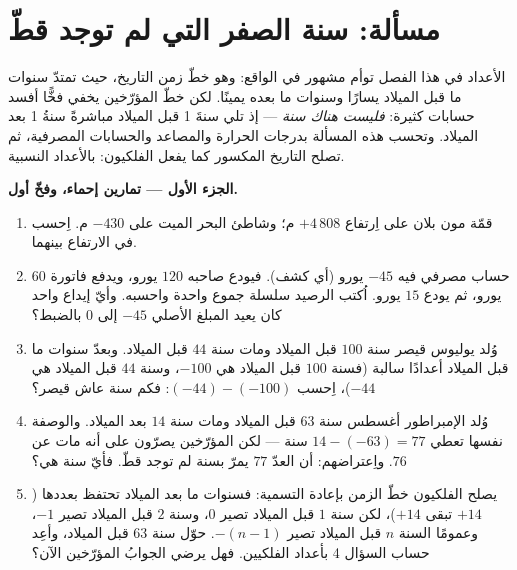 \section{مسألة: سنة الصفر التي لم توجد قطّ}

\begin{problem}
\label{pb:g7:negatives:1}
 الأعداد في هذا الفصل توأم مشهور في الواقع: وهو
خطّ زمن التاريخ، حيث تمتدّ سنوات ما قبل الميلاد يسارًا
وسنوات ما بعده يمينًا. لكن خطّ المؤرّخين يخفي فخًّا
أفسد حسابات كثيرة: \emph{فليست هناك سنة }
--- إذ تلي سنةَ 1 قبل الميلاد مباشرةً سنةُ 1 بعد الميلاد. وتحسب هذه المسألة
بدرجات الحرارة والمصاعد والحسابات المصرفية، ثم تصلح
 التاريخ المكسور كما يفعل الفلكيون: بالأعداد
النسبية.

\medskip
\noindent\textbf{الجزء الأول --- تمارين إحماء، وفخّ أول.}
\begin{enumerate}
  \item قمّة مون بلان على اِرتفاع $+4\,808$ م؛ وشاطئ
        البحر الميت على $-430$ م. اِحسب 
        في الارتفاع بينهما.
  \item حساب مصرفي فيه $-45$ يورو (أي كشف). فيودع
        صاحبه $120$ يورو، ويدفع فاتورة $60$ يورو،
        ثم يودع $15$ يورو. اُكتب الرصيد سلسلة
        جموع واحدة واحسبه. وأيّ إيداع واحد
        كان يعيد المبلغ الأصلي $-45$ إلى
        $0$ بالضبط؟
  \item وُلد يوليوس قيصر سنة $100$ قبل الميلاد ومات سنة $44$ قبل الميلاد.
        وبعدّ سنوات ما قبل الميلاد أعدادًا سالبة (فسنة $100$ قبل الميلاد هي
        $-100$، وسنة $44$ قبل الميلاد هي $-44$)، اِحسب $(-44) - (-100)$: فكم
        سنة عاش قيصر؟
  \item وُلد الإمبراطور أغسطس سنة $63$ قبل الميلاد ومات سنة
        $14$ بعد الميلاد. والوصفة نفسها تعطي $14 - (-63) = 77$ سنة ---
        لكن المؤرّخين يصرّون على أنه مات عن $76$. واِعتراضهم:
        أن العدّ $77$ يمرّ بسنة لم توجد قطّ.
        فأيّ سنة هي؟
  \item يصلح الفلكيون خطّ الزمن بإعادة التسمية: فسنوات ما بعد الميلاد
        تحتفظ بعددها ($+14$ تبقى $+14$)، لكن سنة $1$ قبل الميلاد
        تصير $0$، وسنة $2$ قبل الميلاد تصير $-1$، وعمومًا السنة
        $n$ قبل الميلاد تصير $-(n - 1)$. حوّل سنة $63$ قبل الميلاد، وأعِد
        حساب السؤال 4 بأعداد الفلكيين.
        فهل يرضي الجوابُ المؤرّخين الآن؟
\end{enumerate}


\end{problem}
